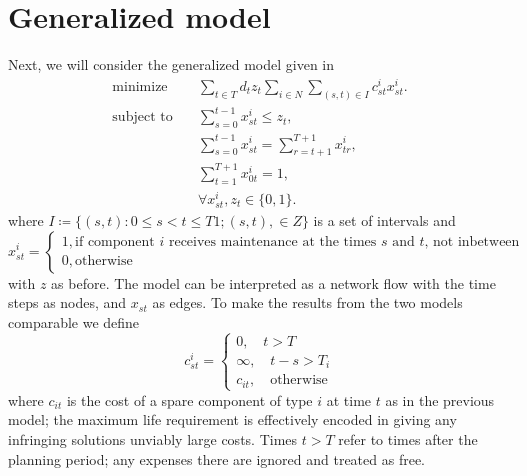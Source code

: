 \documentclass{article}
\begin{document}
\section{Generalized model}
Next, we will consider the generalized model given in
\autocite{gustavsson14}
\begin{equation*}
	\begin{aligned}
        \text{minimize} \quad & \sum_{t \in T} d_t z_t \sum_{i \in N} \sum_{(s,t) \in I} c^i_{st} x^i_{st}. \\
        \text{subject to} \quad & \sum^{t-1}_{s=0} x^i_{st} \le z_t, \\
        & \sum^{t-1}_{s=0} x^i_{st} = \sum^{T+1}_{r=t+1} x^i_{tr}, \\
        & \sum^{T+1}_{t=1} x^i_{0t} = 1, \\
        & \forall x^i_{st}, z_t \in \{0,1\}.
    \end{aligned}
\end{equation*}
where
$I \coloneqq \{(s,t): 0 \le s < t \le T 1; (s,t), \in Z\}$
is a set of intervals and
$$ x^i_{st} = 
\begin{cases} 
 1, \text{if component $i$ receives maintenance at the times $s$ and $t$, not inbetween} \\
 0, \text{otherwise}
\end{cases} $$
with $z$ as before.
The model can be interpreted as a network flow with the
time steps as nodes, and $x_{st}$ as edges.
To make the results from the two models comparable we define
$$ c_{st}^i = \begin{cases}
    0, \quad t > T \\
    \infty, \quad t - s > T_i \\
    c_{it}, \quad \text{otherwise}
\end{cases} $$
where $c_{it}$ is the cost of a spare component of type $i$ at time $t$
as in the previous model;
the maximum life requirement is effectively encoded in giving
any infringing solutions unviably large costs.
Times $t>T$ refer to times after the planning period;
any expenses there are ignored and treated as free.
\end{document}
